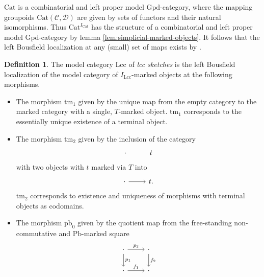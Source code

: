 \documentclass[a4paper]{article}
\theoremstyle{remark}
\theoremstyle{definition}
\newtheorem{definition}[theorem]{Definition}
\begin{document}
$\mathrm{Cat}$ is a combinatorial and left proper model $\mathrm{Gpd}$-category, where the mapping groupoids $\mathrm{Cat}(\mathcal{C}, \mathcal{D})$ are given by sets of functors and their natural isomorphisms.
Thus $\mathrm{Cat}^{I_\mathrm{Cat}}$ has the structure of a combinatorial and left proper model $\mathrm{Gpd}$-category by lemma \ref{lem:simplicial-marked-objects}.
It follows that the left Bousfield localization at any (small) set of maps exists by \cite[Theorem 4.1.1]{hirschhorn}.

\begin{definition}
  \label{def:lcc-axioms}
  The model category $\mathrm{Lcc}$ of \emph{lcc sketches} is the left Bousfield localization of the model category of $I_\mathrm{Lcc}$-marked objects at the following morphisms.
  \begin{itemize}
    \item
      The morphism $\mathrm{tm}_1$ given by the unique map from the empty category to the marked category with a single, $T$-marked object.
      $\mathrm{tm}_1$ corresponds to the essentially unique existence of a terminal object.
    \item
      The morphism $\mathrm{tm}_2$ given by the inclusion of the category
      \begin{equation}
        \begin{tikzcd}
          \cdot & t
        \end{tikzcd}
      \end{equation}
      with two objects with $t$ marked via $T$ into
      \begin{equation}
          \begin{tikzcd}
            \cdot \arrow[r] & t.
          \end{tikzcd}
      \end{equation}
      $\mathrm{tm}_2$ corresponds to existence and uniqueness of morphisms with terminal objects as codomains.
    \item
      \label{itm:pbs-commute}
      The morphism $\mathrm{pb}_0$ given by the quotient map from the free-standing non-commutative and $\mathrm{Pb}$-marked square
      \begin{equation}
        \begin{tikzcd}
          \cdot \arrow[r, "p_2"] \arrow[d, "p_1"] & \cdot \arrow[d, "f_2"] \\
          \cdot \arrow[r, "f_1"] & \cdot
        \end{tikzcd}
      \end{equation}

\end{itemize}
\end{definition}
\end{document}
